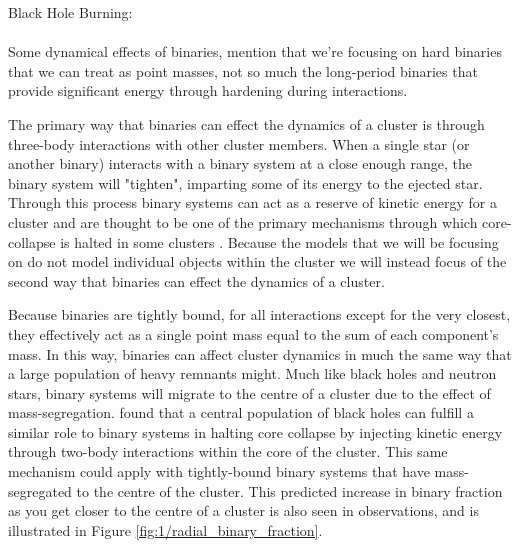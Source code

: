 Black Hole Burning: \citet{Kremer2019}
\paragraph{}


Some dynamical effects of binaries, mention that we're focusing on hard binaries that we can treat
as point masses, not so much the long-period binaries that provide significant energy through
hardening during interactions.

The primary way that binaries can effect the dynamics of a cluster is through three-body
interactions with other cluster members. When a single star (or another binary) interacts with a
binary system at a close enough range, the binary system will "tighten", imparting some of its
energy to the ejected star. Through this process binary systems can act as a reserve of kinetic
energy for a cluster and are thought to be one of the primary mechanisms through which core-collapse
is halted in some clusters \citep{Chatterjee2013}. Because the models that we will be focusing on do
not model individual objects within the cluster we will instead focus of the second way that
binaries can effect the dynamics of a cluster.

Because binaries are tightly bound, for all interactions except for the very closest, they
effectively act as a single point mass equal to the sum of each component's mass. In this way,
binaries can affect cluster dynamics in much the same way that a large population of heavy remnants
might. Much like black holes and neutron stars, binary systems will migrate to the centre of a
cluster due to the effect of mass-segregation. \citet{Kremer2019} found that a central population of
black holes can fulfill a similar role to binary systems in halting core collapse by injecting
kinetic energy through two-body interactions within the core of the cluster. This same mechanism
could apply with tightly-bound binary systems that have mass-segregated to the centre of the
cluster. This predicted increase in binary fraction as you get closer to the centre of a cluster is
also seen in observations, and is illustrated in Figure \ref{fig:1/radial_binary_fraction}.



